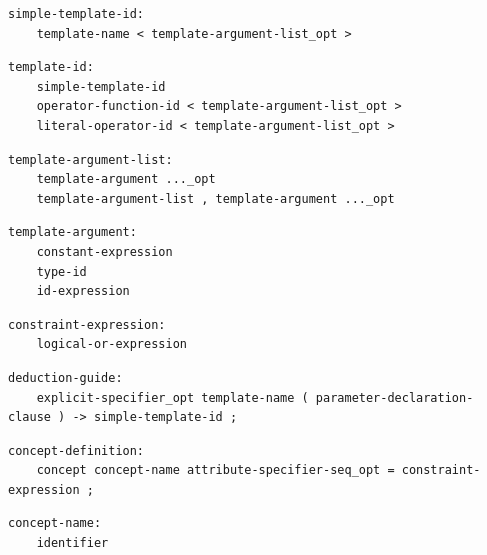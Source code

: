 \noindent\textbf{\texttt{}}\par
\begin{lstlisting}
simple-template-id:
    template-name < template-argument-list_opt >
\end{lstlisting}

\noindent\textbf{\texttt{}}\par
\begin{lstlisting}
template-id:
    simple-template-id
    operator-function-id < template-argument-list_opt >
    literal-operator-id < template-argument-list_opt >
\end{lstlisting}

\noindent\textbf{\texttt{}}\par
\begin{lstlisting}
template-argument-list:
    template-argument ..._opt
    template-argument-list , template-argument ..._opt
\end{lstlisting}

\noindent\textbf{\texttt{}}\par
\begin{lstlisting}
template-argument:
    constant-expression
    type-id
    id-expression
\end{lstlisting}

\noindent\textbf{\texttt{}}\par
\begin{lstlisting}
constraint-expression:
    logical-or-expression
\end{lstlisting}

\noindent\textbf{\texttt{}}\par
\begin{lstlisting}
deduction-guide:
    explicit-specifier_opt template-name ( parameter-declaration-clause ) -> simple-template-id ;
\end{lstlisting}

\noindent\textbf{\texttt{}}\par
\begin{lstlisting}
concept-definition:
    concept concept-name attribute-specifier-seq_opt = constraint-expression ;
\end{lstlisting}

\noindent\textbf{\texttt{}}\par
\begin{lstlisting}
concept-name:
    identifier
\end{lstlisting}

